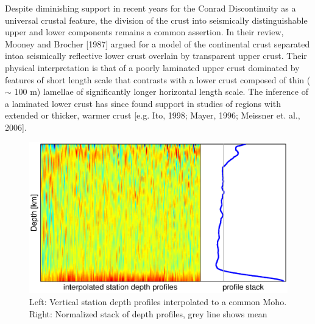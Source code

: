 \documentclass[draft, 12pt]{article}
\begin{document}
Despite diminishing support in recent years for the Conrad Discontinuity as a universal crustal feature, the division of the crust into seismically distinguishable upper and lower components remains a common assertion. In their review, Mooney and Brocher [1987] argued for a model of the continental crust separated intoa seismically reflective lower crust overlain by transparent upper crust. Their physical interpretation is that of a poorly laminated upper crust dominated by features of short length scale that contrasts with a lower crust composed of thin ($\sim$ 100 m) lamellae of significantly longer horizontal length scale. The inference of a laminated lower crust has since found support in studies of regions with extended or thicker, warmer crust [e.g. Ito, 1998; Mayer, 1996; Meissner et. al., 2006].

\begin{figure}
 \centering
 \includegraphics[width=\textwidth]{discontinuityInterp}
 \caption{Left: Vertical station depth profiles interpolated to a common Moho. Right: Normalized stack of depth profiles, grey line shows mean}
 \label{fig:discInterp}
\end{figure}
\end{document}
